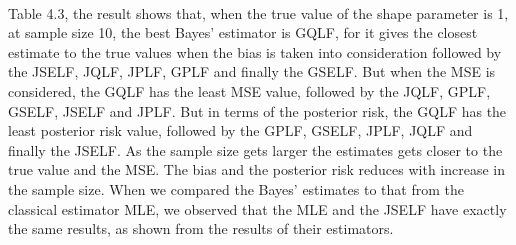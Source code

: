 \documentclass[a4paper,12pt]{report}
\begin{document}
\begin{minipage}{\linewidth}
		
\end{minipage}
\\\vspace{1cm}

\indent Table 4.3, the result shows that, when the true value of the shape parameter is 1, at sample size 10, the best Bayes’ estimator is GQLF, for it gives the closest estimate to the true values when the bias is taken into consideration followed by the JSELF, JQLF, JPLF, GPLF and finally the GSELF. But when the MSE is considered, the GQLF has the least MSE value, followed by the JQLF, GPLF, GSELF, JSELF and JPLF. But in terms of the posterior risk, the GQLF has the least posterior risk value, followed by the GPLF, GSELF, JPLF, JQLF and finally the JSELF.
As the sample size gets larger the estimates gets closer to the true value and the MSE. The bias and the posterior risk reduces with increase in the sample size. When we compared the Bayes’ estimates to that from the classical estimator MLE, we observed that the MLE and the JSELF have exactly the same results, as shown from the results of their estimators.\\
\end{document}
